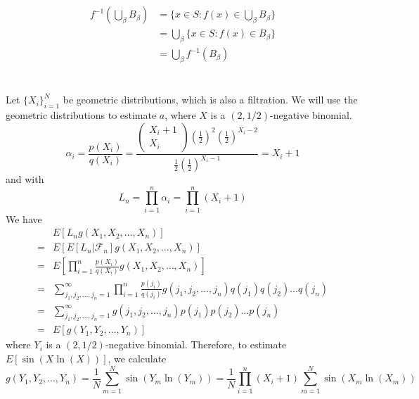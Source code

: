 \documentclass[11pt]{report}
\begin{document}
\subsection{}
\begin{equation*}
    \begin{aligned}
        f^{-1} \left(\bigcup_\beta B_\beta \right) &= \{x \in S: f(x) \in \bigcup_\beta B_\beta \} \\
        &= \bigcup_\beta \{x \in S: f(x) \in B_\beta\} \\
        &= \bigcup_\beta f^{-1}(B_\beta) 
    \end{aligned}
\end{equation*}
\newpage
\section{}
Let $\{X_i\}_{i=1}^N$ be geometric distributions, which is also a filtration. We will use the geometric distributions to estimate $a$, 
where $X$ is a $(2,1/2)$-negative binomial.  
\[
    \alpha_i = \frac{p(X_i)}{q(X_i)} = \frac{\begin{pmatrix} X_i+1 \\ X_i \end{pmatrix} \left(\frac{1}{2}\right)^2 \left( \frac{1}{2}\right)^{X_i-2}}{\frac{1}{2} \left( \frac{1}{2}\right)^{X_i-1}} = X_i + 1
\]
and with
\[
    L_n = \prod_{i=1}^n \alpha_i = \prod_{i=1}^n (X_i + 1)
\]
We have
\begin{equation*}
    \begin{aligned}
        &E[L_n g(X_1,X_2, \hdots, X_n)] \\
        =& E[ E[L_n | \mathcal{F}_n] g(X_1, X_2, \hdots, X_n)] \\
        =& E\left[\prod_{i=1}^n \frac{p(X_i)}{q(X_i)} g(X_1,X_2, \hdots, X_n) \right] \\
        =& \sum_{j_1, j_2, \hdots, j_n = 1}^\infty \prod_{i=1}^n \frac{p(j_i)}{q(j_i)} g(j_1, j_2, \hdots, j_n) q(j_1) q(j_2) \hdots q(j_n) \\
        =& \sum_{j_1, j_2, \hdots, j_n = 1}^\infty g(j_1, j_2, \hdots, j_n) p(j_1)p(j_2)\hdots p(j_n) \\
        =& E[g(Y_1, Y_2, \hdots, Y_n)]
    \end{aligned}
\end{equation*}
where $Y_i$ is a $(2,1/2)$-negative binomial.
Therefore, to estimate $E[\sin(X\ln(X))]$, we calculate
\[
    g(Y_1, Y_2, \hdots, Y_n) = \frac{1}{N} \sum_{m=1}^N \sin(Y_m \ln(Y_m)) = \frac{1}{N} \prod_{i=1}^n (X_i+1)  \sum_{m=1}^N \sin(X_m \ln(X_m)) 
\]
\end{document}
